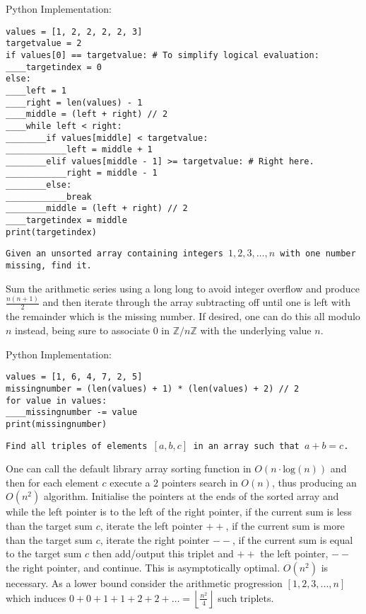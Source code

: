 Python Implementation:

\begin{verbatim}
values = [1, 2, 2, 2, 2, 3]
targetvalue = 2
if values[0] == targetvalue: # To simplify logical evaluation:
____targetindex = 0
else:
____left = 1
____right = len(values) - 1
____middle = (left + right) // 2
____while left < right:
________if values[middle] < targetvalue:
____________left = middle + 1
________elif values[middle - 1] >= targetvalue: # Right here.
____________right = middle - 1
________else:
____________break
________middle = (left + right) // 2
____targetindex = middle
print(targetindex)
\end{verbatim}

\texttt{Given an unsorted array containing integers $1,2,3,\dots,n$ with one number missing, find it.}

Sum the arithmetic series using a long long to avoid integer overflow and produce $\frac{n(n+1)}{2}$ and then iterate through the array subtracting off until one is left with the remainder which is the missing number. If desired, one can do this all modulo $n$ instead, being sure to associate $0$ in $\mathbb{Z}/n\mathbb{Z}$ with the underlying value $n$.

Python Implementation:

\begin{verbatim}
values = [1, 6, 4, 7, 2, 5]
missingnumber = (len(values) + 1) * (len(values) + 2) // 2
for value in values:
____missingnumber -= value
print(missingnumber)
\end{verbatim}

\texttt{Find all triples of elements $[a,b,c]$ in an array such that $a+b=c$.}

One can call the default library array sorting function in $O(n \cdot \text{log}(n))$ and then for each element $c$ execute a $2$ pointers search in $O(n)$, thus producing an $O(n^2)$ algorithm. Initialise the pointers at the ends of the sorted array and while the left pointer is to the left of the right pointer, if the current sum is less than the target sum $c$, iterate the left pointer $++$, if the current sum is more than the target sum $c$, iterate the right pointer $--$, if the current sum is equal to the target sum $c$ then add/output this triplet and $++$ the left pointer, $--$ the right pointer, and continue. This is asymptotically optimal. $O(n^2)$ is necessary. As a lower bound consider the arithmetic progression $[1,2,3,...,n]$ which induces $0+0+1+1+2+2+\dots = \left \lfloor \frac{n^2}{4} \right \rfloor$ such triplets.

